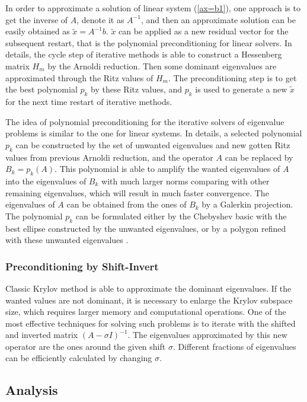 In order to approximate a solution of linear system (\ref{ax=b1}), one approach is to get the inverse of $A$, denote it as $A^{-1}$, and then an approximate solution can be easily obtained as $\tilde{x}=A^{-1}b$. $\tilde{x}$ can be applied as a new residual vector for the subsequent restart, that is the polynomial preconditioning for linear solvers. In details, the cycle step of iterative methods is able to construct a Hessenberg matrix $H_m$ by the Arnoldi reduction. Then some dominant eigenvalues are approximated through the Ritz values of $H_m$. The preconditioning step is to get the best polynomial $p_k$ by these Ritz values, and $p_k$ is used to generate a new  $\tilde{x}$ for the next time restart of iterative methods.

The idea of polynomial preconditioning for the iterative solvers of eigenvalue problems is similar to the one for linear systems. In details, a selected polynomial $p_k$ can be constructed by the set of unwanted eigenvalues and new gotten Ritz values from previous Arnoldi reduction, and the operator $A$ can be replaced by $B_k=p_k(A)$. This polynomial is able to amplify the wanted eigenvalues of $A$ into the eigenvalues of $B_k$ with much larger norms comparing with other remaining eigenvalues, which will result in much faster convergence. The eigenvalues of $A$ can be obtained from the ones of $B_k$ by a Galerkin projection. The polynomial $p_k$ can be formulated either by the Chebyshev basic with the best ellipse constructed by the unwanted eigenvalues\cite{saad1987least}, or by a polygon refined with these unwanted eigenvalues \cite{manteuffel1977tchebychev}.

\subsubsection{Preconditioning by Shift-Invert}

Classic Krylov method is able to approximate the dominant eigenvalues. If the wanted values are not dominant, it is necessary to enlarge the Krylov subspace size, which requires larger memory and computational operations. One of the most effective techniques for solving such problems is to iterate with the shifted and inverted matrix $(A-\sigma I)^{-1}$. The eigenvalues approximated by this new operator are the ones around the given shift $\sigma$. Different fractions of eigenvalues can be efficiently calculated by changing $\sigma$.

\subsection{Analysis}

